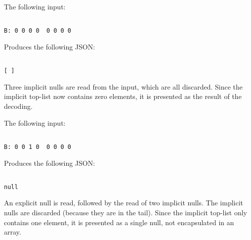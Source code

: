 The following input:

\begin{changemargin}{-60mm}{0mm}
\begin{myquote}
\begin{verbatim}

B: 0 0 0 0  0 0 0 0

\end{verbatim}
\end{myquote}
\end{changemargin}

Produces the following JSON:

\begin{changemargin}{-60mm}{0mm}
\begin{myquote}
\begin{verbatim}

[ ]

\end{verbatim}
\end{myquote}
\end{changemargin}

Three implicit nulls are read from the input, which are all discarded.
Since the implicit top-list now contains zero elements, it is presented
as the result of the decoding.

The following input:

\begin{changemargin}{-60mm}{0mm}
\begin{myquote}
\begin{verbatim}

B: 0 0 1 0  0 0 0 0

\end{verbatim}
\end{myquote}
\end{changemargin}

Produces the following JSON:

\begin{changemargin}{-60mm}{0mm}
\begin{myquote}
\begin{verbatim}

null

\end{verbatim}
\end{myquote}
\end{changemargin}

An explicit null is read, followed by the read of two implicit nulls.
The implicit nulls are discarded (because they are in the tail).
Since the implicit top-list only contains one element, it is presented
as a single null, not encapsulated in an array.

